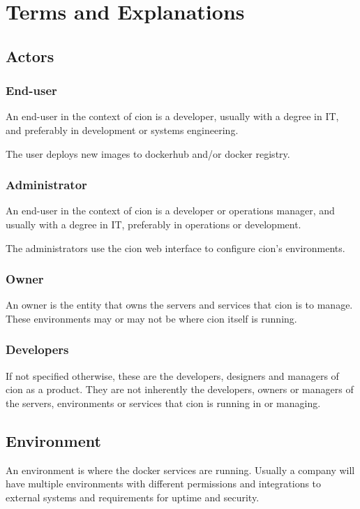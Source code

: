 \chapter{Terms and Explanations}
\label{appendix:termsexp}

\section{Actors}

\subsection{End-user}
An end-user in the context of cion is a developer, usually with a degree in IT, and preferably in development or systems engineering.

The user deploys new images to dockerhub and/or docker registry.

\subsection{Administrator}
An end-user in the context of cion is a developer or operations manager, and usually with a degree in IT, preferably in operations or development.

The administrators use the cion web interface to configure cion's environments. 

\subsection{Owner}
An owner is the entity that owns the servers and services that cion is to manage. These environments may or may not be where cion itself is running.

\subsection{Developers}
If not specified otherwise, these are the developers, designers and managers of cion as a product. They are not inherently the developers, owners or managers of the servers, environments or services that cion is running in or managing.

\section{Environment}
An environment is where the docker services are running. Usually a company will have multiple environments with different permissions and integrations to external systems and requirements for uptime and security.

